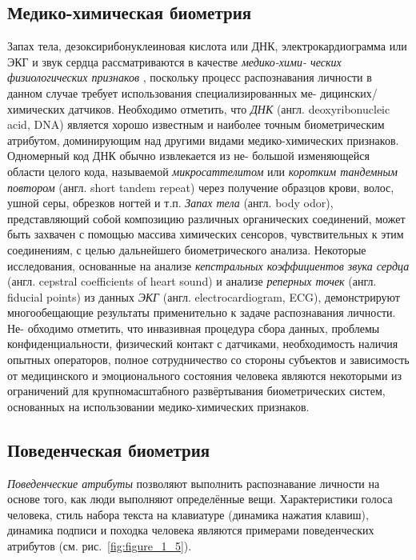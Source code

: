 \documentclass[12pt]{book}
\begin{document}
\subsection{Медико-химическая биометрия}

\large{Запах тела, дезоксирибонуклеиновая кислота или ДНК, электрокардиограмма или ЭКГ и звук сердца рассматриваются в качестве \textit{медико-хими- ческих физиологических признаков} \cite{unar_2014}, поскольку процесс распознавания личности в данном случае требует использования специализированных ме- дицинских/химических датчиков. Необходимо отметить, что \textit{ДНК} (англ. deoxyribonucleic acid, DNA) является хорошо известным и наиболее точным биометрическим атрибутом, доминирующим над другими видами медико-химических признаков. Одномерный код ДНК обычно извлекается из не- большой изменяющейся области целого кода, называемой \textit{микросаттелитом} или \textit{коротким тандемным повтором} (англ. short tandem repeat) через получение образцов крови, волос, ушной серы, обрезков ногтей и т.п. \textit{Запах тела} (англ. body odor), представляющий собой композицию различных органических соединений, может быть захвачен с помощью массива химических сенсоров, чувствительных к этим соединениям, с целью дальнейшего биометрического анализа. Некоторые исследования, основанные на анализе \textit{кепстральных коэффициентов звука сердца} (англ. cepstral coefficients of heart sound) и анализе \textit{реперных точек} (англ. fiducial points) из данных \textit{ЭКГ} (англ. electrocardiogram, ECG), демонстрируют многообещающие результаты применительно к задаче распознавания личности. Не- обходимо отметить, что инвазивная процедура сбора данных, проблемы конфиденциальности, физический контакт с датчиками, необходимость наличия опытных операторов, полное сотрудничество со стороны субъектов и зависимость от медицинского и эмоционального состояния человека являются некоторыми из ограничений для крупномасштабного развёртывания биометрических систем, основанных на использовании медико-химических признаков.}

\subsection{Поведенческая биометрия}

\large{\textit{Поведенческие атрибуты} \cite{unar_2014} позволяют выполнить распознавание личности на основе того, как люди выполняют определённые вещи. Характеристики голоса человека, стиль набора текста на клавиатуре (динамика нажатия клавиш), динамика подписи и походка человека являются примерами поведенческих атрибутов (см. рис.~\ref{fig:figure_1_5}).}
\end{document}
